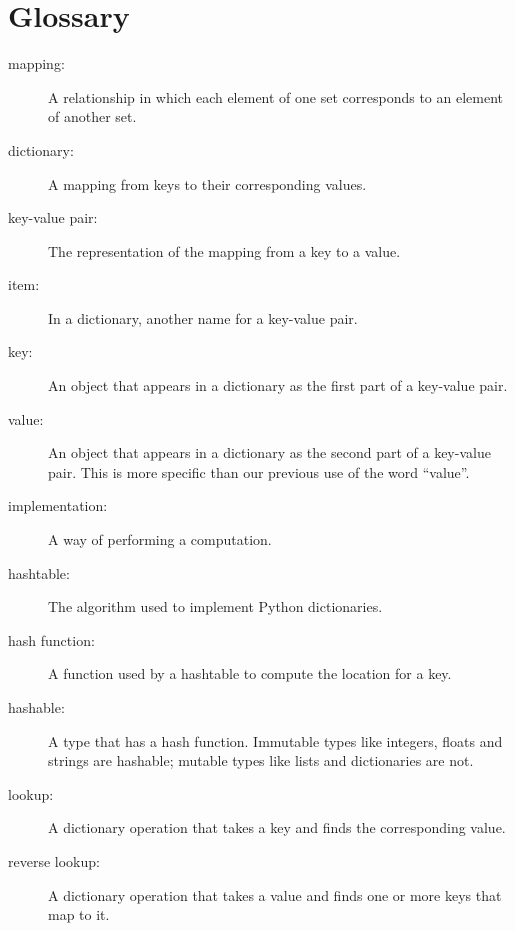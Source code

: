 \documentclass[
DIV=11,
fontsize=13,
twoside,
headinclude=false,
titlepage=firstiscover,
abstract=true,
headsepline=true,
footsepline=true,
chapterprefix=true, %
headings=big,
bibliography=totoc,%
captions=tableheading
]{scrbook}
\theoremstyle{definition}
\begin{document}
\section{Glossary}

\begin{description}

\item[mapping:] A relationship in which each element of one set
corresponds to an element of another set.

\item[dictionary:] A mapping from keys to their
corresponding values.

\item[key-value pair:] The representation of the mapping from
a key to a value.

\item[item:] In a dictionary, another name for a key-value
  pair.

\item[key:] An object that appears in a dictionary as the
first part of a key-value pair.

\item[value:] An object that appears in a dictionary as the
second part of a key-value pair.  This is more specific than
our previous use of the word ``value''.

\item[implementation:] A way of performing a computation.

\item[hashtable:] The algorithm used to implement Python
dictionaries.

\item[hash function:] A function used by a hashtable to compute the
location for a key.

\item[hashable:] A type that has a hash function.  Immutable
types like integers,
floats and strings are hashable; mutable types like lists and
dictionaries are not.

\item[lookup:] A dictionary operation that takes a key and finds
the corresponding value.

\item[reverse lookup:] A dictionary operation that takes a value and finds
one or more keys that map to it.


\end{description}
\end{document}
